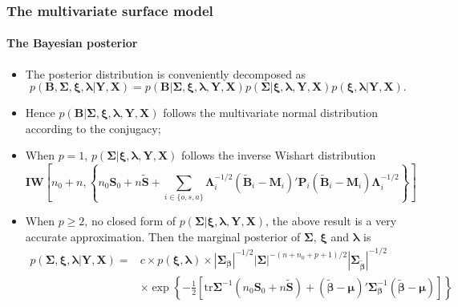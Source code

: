 \documentclass[10pt]{beamer}
\begin{document}
\begin{frame}
  \frametitle{The multivariate surface model}
  \framesubtitle{The Bayesian posterior}
  \begin{itemize}
  \item The posterior distribution is conveniently decomposed as
    \[
    p(\bm{B},\bm{\Sigma},\bm{\xi},\bm{\lambda}|\bm{Y},\bm{X})=p(\bm{B}|\bm{\Sigma},\bm{\xi},\bm{\lambda},\bm{Y},\bm{X})p(\bm{\Sigma}|\bm{\xi},\bm{\lambda},\bm{Y},\bm{X})p(\bm{\xi},\bm{\lambda}|\bm{Y},\bm{X}).
    \]
  \item Hence $p(\bm{B}|\bm{\Sigma},\bm{\xi},\bm{\lambda},\bm{Y},\bm{X})$ follows
    the multivariate normal distribution according to the conjugacy;
  \item When $p=1$, $p(\bm{\Sigma}|\bm{\xi},\bm{\lambda},\bm{Y},\bm{X})$ follows the inverse Wishart distribution
    \[
    \bm{IW} \left[n_0+n, \left\{{n_0}{\bm{S}_0} + n \tilde {\bm{S}} +
        \sum\limits_{i \in \{ o,s,a\} } {{\bm{\Lambda}}_i^{-1/2}({{\tilde
              {\bm{B}}_i}} - {\bm{M}_i})'{\bm{P}_i}({{\tilde {\bm{B}}}_i} -
          {\bm{M}_i}){\bm{\Lambda}}_i^{ - 1/2}}\right\} \right]
    \]
  \item When $p \geq 2$, no closed form of
    $p(\bm{\Sigma}|\bm{\xi},\bm{\lambda},\bm{Y},\bm{X})$, the above result is a
    very accurate approximation. Then the marginal posterior of $\bm{\Sigma}$,
    $\bm{\xi}$ and $\bm{\lambda}$ is
    \[\begin{split}
      p\left(\bm{\Sigma}, {\bm{\xi} ,\bm{\lambda} |\bm{Y},\bm{X}} \right) =
      &c\times p(\bm{\xi},\bm{\lambda})\times {|
        {{\bm{\Sigma}_{\bm{\beta}} }} |^{ - 1/2}}{| \bm{\Sigma} |^{ - (n + {n_0} + p +
          1)/2}}{| {{\bm{\Sigma}_{\bm{\tilde
                \beta} }}} |^{ - 1/2}}\\
      &\times \exp \left\{ { - \frac{1}{2}\left[ {\mathrm{tr}{\bm{\Sigma}^{ - 1}}\left(
                {{n_0}{\bm{S}_0} + n\bm{\tilde S}} \right) + \left( {\bm{\tilde \beta} -
                  \bm{\mu} } \right)'{\bm{\Sigma}_{\bm{\beta}}^{-1} }\left( {\bm{\tilde \beta} - \bm{\mu} }
              \right)} \right]} \right\}
    \end{split}\]
  \end{itemize}
\end{frame}
\end{document}
